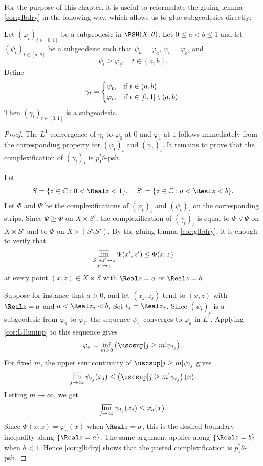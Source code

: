 For the purpose of this chapter, it is useful to reformulate the gluing lemma \cref{cor:glbdry} in the following way, which allows us to glue subgeodesics directly:
\begin{lemma}\label{lma:subgeodgluing}
    Let $(\varphi_t)_{t\in [0,1]}$ be a subgeodesic in $\PSH(X,\theta)$. Let $0\leq a<b\leq 1$ and let $(\psi_t)_{t\in [a,b]}$ be a subgeodesic such that $\psi_a=\varphi_a$, $\psi_b=\varphi_b$, and
    \[
        \psi_t\geq \varphi_t,\quad t\in (a,b).
    \]
    Define
    \[
    \gamma_t=
    \begin{cases}
        \psi_t,&\textup{if }t\in (a,b),\\
        \varphi_t,&\textup{if }t\in [0,1]\setminus (a,b).
    \end{cases}
    \]
    Then $(\gamma_t)_{t\in [0,1]}$ is a subgeodesic.
\end{lemma}
\begin{proof}
    The $L^1$-convergence of $\gamma_t$ to $\varphi_0$ at $0$ and $\varphi_1$ at $1$ follows immediately from the corresponding property for $(\varphi_t)_t$ and $(\psi_t)_t$.
    It remains to prove that the complexification of $(\gamma_t)_t$ is $p_1^*\theta$-psh.

    Let
    \[
        S=\{z\in\mathbb{C}:0<\Real z<1\},\quad S'=\{z\in\mathbb{C}:a<\Real z<b\}.
    \]
    Let $\Phi$ and $\Psi$ be the complexifications of $(\varphi_t)_t$ and $(\psi_t)_t$ on the corresponding strips. Since $\Psi\geq \Phi$ on $X\times S'$, the complexification of $(\gamma_t)_t$ is equal to $\Phi\lor\Psi$ on $X\times S'$ and to $\Phi$ on $X\times (S\setminus S')$.
    By the gluing lemma \cref{cor:glbdry}, it is enough to verify that
    \[
        \varlimsup_{\substack{S'\ni z'\to z\\ x'\to x}}\Psi(x',z')\leq \Phi(x,z)
    \]
    at every point $(x,z)\in X\times S$ with $\Real z=a$ or $\Real z=b$.

    Suppose for instance that $a>0$, and let $(x_j,z_j)$ tend to $(x,z)$ with $\Real z=a$ and $a<\Real z_j<b$. Set $t_j=\Real z_j$. Since $(\psi_t)_t$ is a subgeodesic from $\varphi_a$ to $\varphi_b$, the sequence $\psi_{t_j}$ converges to $\varphi_a$ in $L^1$. Applying \cref{cor:L1limipp} to this sequence gives
    \[
        \varphi_a=\inf_{m>0}\left(\uscsup[j\geq m]\psi_{t_j}\right).
    \]
    For fixed $m$, the upper semicontinuity of $\uscsup[j\geq m]\psi_{t_j}$ gives
    \[
        \varlimsup_{j\to\infty}\psi_{t_j}(x_j)\leq \left(\uscsup[j\geq m]\psi_{t_j}\right)(x).
    \]
    Letting $m\to\infty$, we get
    \[
        \varlimsup_{j\to\infty}\psi_{t_j}(x_j)\leq \varphi_a(x).
    \]
    Since $\Phi(x,z)=\varphi_a(x)$ when $\Real z=a$, this is the desired boundary inequality along $\{\Real z=a\}$. The same argument applies along $\{\Real z=b\}$ when $b<1$. Hence \cref{cor:glbdry} shows that the pasted complexification is $p_1^*\theta$-psh.
\end{proof}

